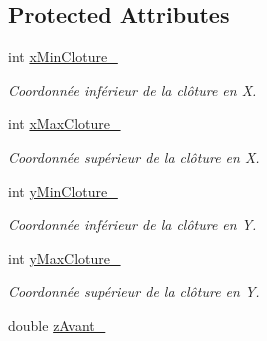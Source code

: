 \subsection*{Protected Attributes}
\begin{DoxyCompactItemize}
\item 
\hypertarget{classvue_1_1_projection_ab72f1930aa81faf98b2a9cb60f54af33}{}int \hyperlink{classvue_1_1_projection_ab72f1930aa81faf98b2a9cb60f54af33}{x\+Min\+Cloture\+\_\+}\label{classvue_1_1_projection_ab72f1930aa81faf98b2a9cb60f54af33}

\begin{DoxyCompactList}\small\item\em Coordonnée inférieur de la clôture en X. \end{DoxyCompactList}\item 
\hypertarget{classvue_1_1_projection_abaed989322960f44c619b5a22e51dc22}{}int \hyperlink{classvue_1_1_projection_abaed989322960f44c619b5a22e51dc22}{x\+Max\+Cloture\+\_\+}\label{classvue_1_1_projection_abaed989322960f44c619b5a22e51dc22}

\begin{DoxyCompactList}\small\item\em Coordonnée supérieur de la clôture en X. \end{DoxyCompactList}\item 
\hypertarget{classvue_1_1_projection_a347192bd39c5ba331e97061f797ed3f0}{}int \hyperlink{classvue_1_1_projection_a347192bd39c5ba331e97061f797ed3f0}{y\+Min\+Cloture\+\_\+}\label{classvue_1_1_projection_a347192bd39c5ba331e97061f797ed3f0}

\begin{DoxyCompactList}\small\item\em Coordonnée inférieur de la clôture en Y. \end{DoxyCompactList}\item 
\hypertarget{classvue_1_1_projection_a6f60c6c82b2c79d647fde24fbe67b23c}{}int \hyperlink{classvue_1_1_projection_a6f60c6c82b2c79d647fde24fbe67b23c}{y\+Max\+Cloture\+\_\+}\label{classvue_1_1_projection_a6f60c6c82b2c79d647fde24fbe67b23c}

\begin{DoxyCompactList}\small\item\em Coordonnée supérieur de la clôture en Y. \end{DoxyCompactList}\item 
\hypertarget{classvue_1_1_projection_a7decea4d1b5a891a9457f4ef00575e27}{}double \hyperlink{classvue_1_1_projection_a7decea4d1b5a891a9457f4ef00575e27}{z\+Avant\+\_\+}\label{classvue_1_1_projection_a7decea4d1b5a891a9457f4ef00575e27}


\end{DoxyCompactItemize}
